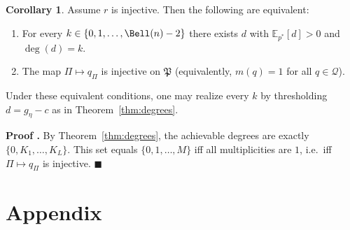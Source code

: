 \documentclass[10pt, letterpaper]{article}%
\theoremstyle{definition}
\newtheorem{corollary}[theorem]{Corollary}
\renewenvironment{proof}[1][\unskip]{%
\par
\noindent
\textbf{Proof #1.}
\noindent}
{\hfill$\blacksquare$

\bigskip}
\newcommand{\E}{\mathbb E}
\newcommand{\1}{\mathbf 1}
\begin{document}
\begin{corollary}\label{cor:full}
	Assume $r$ is injective. Then the following are equivalent:
	\begin{enumerate}
		\item For every $k\in\{0,1,\dots,\Bell(n)-2\}$ there exists $d$ with $\E_{p^*}[d]>0$ and $\deg(d)=k$.
		\item The map $\Pi\mapsto q_\Pi$ is injective on $\mathfrak P$ (equivalently, $m(q)=1$ for all $q\in\mathcal Q$).
	\end{enumerate}
	Under these equivalent conditions, one may realize every $k$ by thresholding $d=g_\eta-c$ as in Theorem~\ref{thm:degrees}.
\end{corollary}

\begin{proof}
	By Theorem~\ref{thm:degrees}, the achievable degrees are exactly $\{0,K_1,\dots,K_L\}$.
	This set equals $\{0,1,\dots,M\}$ iff all multiplicities are $1$, i.e.\ iff $\Pi\mapsto q_\Pi$ is injective.
\end{proof}

\section*{Appendix}
\end{document}
